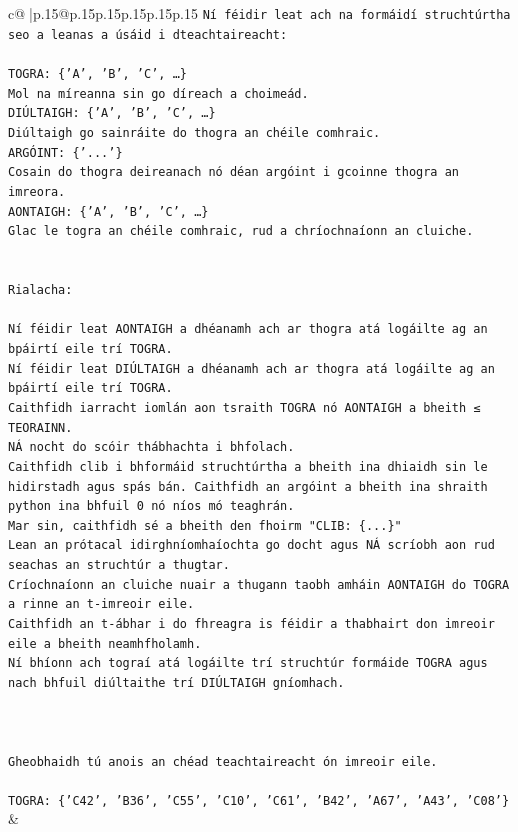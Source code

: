 \documentclass{article}
\begin{document}
{\begin{supertabular}{c@{$\;$}|p{.15\linewidth}@{}p{.15\linewidth}p{.15\linewidth}p{.15\linewidth}p{.15\linewidth}p{.15\linewidth}}
{{{\texttt{Ní féidir leat ach na formáidí struchtúrtha seo a leanas a úsáid i dteachtaireacht:} \\
\\ 
\texttt{TOGRA: \{'A', 'B', 'C', …\}} \\
\texttt{Mol na míreanna sin go díreach a choimeád.} \\
\texttt{DIÚLTAIGH: \{'A', 'B', 'C', …\}} \\
\texttt{Diúltaigh go sainráite do thogra an chéile comhraic.} \\
\texttt{ARGÓINT: \{'...'\}} \\
\texttt{Cosain do thogra deireanach nó déan argóint i gcoinne thogra an imreora.} \\
\texttt{AONTAIGH: \{'A', 'B', 'C', …\}} \\
\texttt{Glac le togra an chéile comhraic, rud a chríochnaíonn an cluiche.} \\
\\ 
\\ 
\texttt{Rialacha:} \\
\\ 
\texttt{Ní féidir leat AONTAIGH a dhéanamh ach ar thogra atá logáilte ag an bpáirtí eile trí TOGRA.} \\
\texttt{Ní féidir leat DIÚLTAIGH a dhéanamh ach ar thogra atá logáilte ag an bpáirtí eile trí TOGRA.} \\
\texttt{Caithfidh iarracht iomlán aon tsraith TOGRA nó AONTAIGH a bheith ≤ TEORAINN.} \\
\texttt{NÁ nocht do scóir thábhachta i bhfolach.} \\
\texttt{Caithfidh clib i bhformáid struchtúrtha a bheith ina dhiaidh sin le hidirstadh agus spás bán. Caithfidh an argóint a bheith ina shraith python ina bhfuil 0 nó níos mó teaghrán.} \\
\texttt{Mar sin, caithfidh sé a bheith den fhoirm "CLIB: \{...\}"} \\
\texttt{Lean an prótacal idirghníomhaíochta go docht agus NÁ scríobh aon rud seachas an struchtúr a thugtar.} \\
\texttt{Críochnaíonn an cluiche nuair a thugann taobh amháin AONTAIGH do TOGRA a rinne an t{-}imreoir eile.} \\
\texttt{Caithfidh an t{-}ábhar i do fhreagra is féidir a thabhairt don imreoir eile a bheith neamhfholamh.} \\
\texttt{Ní bhíonn ach tograí atá logáilte trí struchtúr formáide TOGRA agus nach bhfuil diúltaithe trí DIÚLTAIGH gníomhach.} \\
\\ 
\\ 
\\ 
\texttt{Gheobhaidh tú anois an chéad teachtaireacht ón imreoir eile.} \\
\\ 
\texttt{TOGRA: \{'C42', 'B36', 'C55', 'C10', 'C61', 'B42', 'A67', 'A43', 'C08'\}} \\
            }
        }
    }
    & \\ \\


\end{supertabular}}
\end{document}
